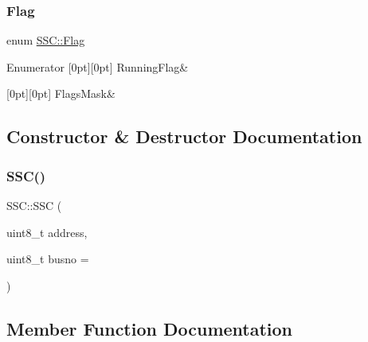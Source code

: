 \mbox{\label{class_s_s_c_a95389fc10623e73e03eadd68537cae36}} 
\subsubsection{\texorpdfstring{Flag}{Flag}}
{\footnotesize\ttfamily enum \hyperlink{class_s_s_c_a95389fc10623e73e03eadd68537cae36}{S\+S\+C\+::\+Flag}}

\begin{DoxyEnumFields}{Enumerator}
[0pt][0pt]{}\mbox{\label{class_s_s_c_a95389fc10623e73e03eadd68537cae36ac786b8fb0917e08dd50a7f5707a7bd37}} 
Running\+Flag&\\
\hline

[0pt][0pt]{}\mbox{\label{class_s_s_c_a95389fc10623e73e03eadd68537cae36ab07017339c262306cffe6214381010de}} 
Flags\+Mask&\\
\hline

\end{DoxyEnumFields}


\subsection{Constructor \& Destructor Documentation}
\mbox{\label{class_s_s_c_a461deb0de60c249716862705835c7c24}} 
\subsubsection{\texorpdfstring{S\+S\+C()}{SSC()}}
{\footnotesize\ttfamily S\+S\+C\+::\+S\+SC (\begin{DoxyParamCaption}\item[{uint8\+\_\+t}]{address,  }\item[{uint8\+\_\+t}]{busno = {} }\end{DoxyParamCaption})}



\subsection{Member Function Documentation}
\mbox{\label{class_s_s_c_ac6607ee7e74a8c7430406123025c2ac0}} 
